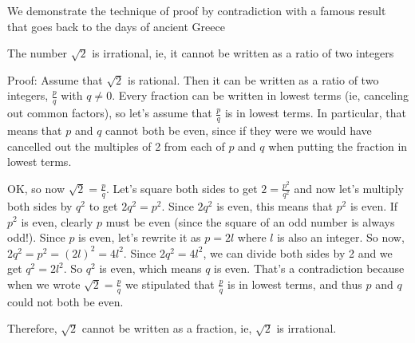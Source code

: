 \documentclass[8pt,a4paper,compress]{beamer}
\begin{document}
\begin{frame}[fragile]
\pause

We demonstrate the technique of proof by contradiction with a famous result that goes back to the days of ancient Greece

\pause

\begin{framed}
The number $\sqrt{2}$ is irrational, ie, it cannot be written as a ratio of two integers
\end{framed}

\pause
\smallskip

Proof: Assume that $\sqrt{2}$ is rational. Then it can be written as a ratio of two integers, $\frac{p}{q}$ with $q \neq 0$. Every fraction can be written in lowest terms (ie, canceling out common factors), so let's assume that $\frac{p}{q}$ is in lowest terms. In particular, that means that $p$ and $q$ cannot both be even, since if they were we would have cancelled out the multiples of 2 from each of $p$ and $q$ when putting the fraction in lowest terms.

\pause
\bigskip

OK, so now $\sqrt{2}=\frac{p}{q}$. Let's square both sides to get $2=\frac{p^2}{q^2}$ and now let's multiply both sides by $q^2$ to get $2q^2=p^2$. Since $2q^2$ is even, this means that $p^2$ is even. If $p^2$ is even, clearly $p$ must be even (since the square of an odd number is always odd!). Since $p$ is even, let's rewrite it as $p=2l$ where $l$ is also an integer. So now, $2q^2=p^2=(2l)^2=4l^2$. Since $2q^2=4l^2$, we can divide both sides by 2 and we get $q^2=2l^2$. So $q^2$ is even, which means $q$ is even. That's a contradiction because when we wrote $\sqrt{2}=\frac{p}{q}$ we stipulated that $\frac{p}{q}$ is in lowest terms, and thus $p$ and $q$ could not both be even.

\pause
\bigskip

Therefore, $\sqrt{2}$ cannot be written as a fraction, ie, $\sqrt{2}$ is irrational.
\end{frame}
\end{document}
